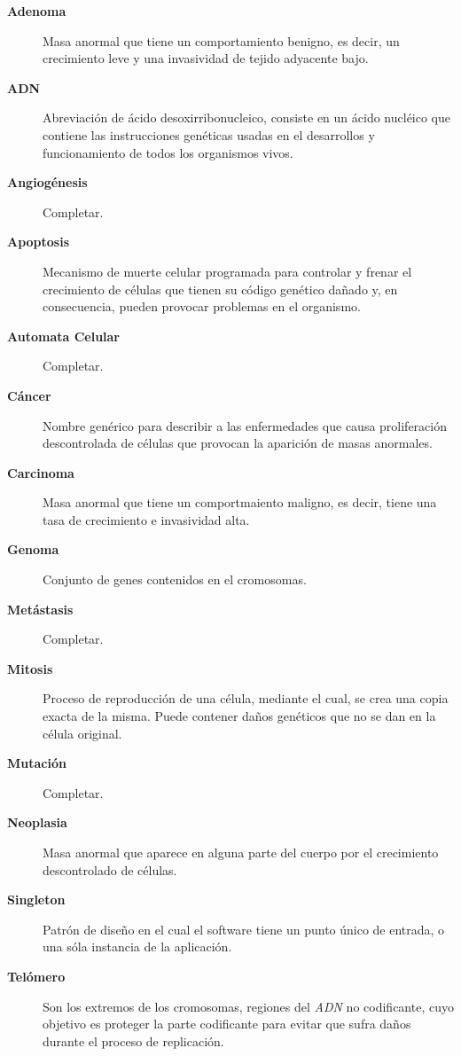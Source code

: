 \begin{description}
    \item[\textbf{Adenoma}] Masa anormal que tiene un comportamiento benigno, es decir, un crecimiento leve y una invasividad de tejido adyacente bajo.
    \item[\textbf{ADN}] Abreviación de ácido desoxirribonucleico, consiste en un ácido nucléico que contiene las instrucciones genéticas usadas en el desarrollos y funcionamiento de todos los organismos vivos.
    \item[\textbf{Angiogénesis}] Completar.
    \item[\textbf{Apoptosis}] Mecanismo de muerte celular programada para controlar y frenar el crecimiento de células que tienen su código genético dañado y, en consecuencia, pueden provocar problemas en el organismo.
    \item[\textbf{Automata Celular}] Completar.
    \item[\textbf{Cáncer}] Nombre genérico para describir a las enfermedades que causa proliferación descontrolada de células que provocan la aparición de masas anormales.
    \item[\textbf{Carcinoma}] Masa anormal que tiene un comportmaiento maligno, es decir, tiene una tasa de crecimiento e invasividad alta.
    \item[\textbf{Genoma}] Conjunto de genes contenidos en el cromosomas.
    \item[\textbf{Metástasis}] Completar.
    \item[\textbf{Mitosis}] Proceso de reproducción de una célula, mediante el cual, se crea una copia exacta de la misma. Puede contener daños genéticos que no se dan en la célula original.
    \item[\textbf{Mutación}] Completar.
    \item[\textbf{Neoplasia}] Masa anormal que aparece en alguna parte del cuerpo por el crecimiento descontrolado de células.
    \item[\textbf{Singleton}] Patrón de diseño en el cual el software tiene un punto único de entrada, o una sóla instancia de la aplicación.
    \item[\textbf{Telómero}] Son los extremos de los cromosomas, regiones del \textit{ADN} no codificante, cuyo objetivo es proteger la parte codificante para evitar que sufra daños durante el proceso de replicación.
\end{description}
